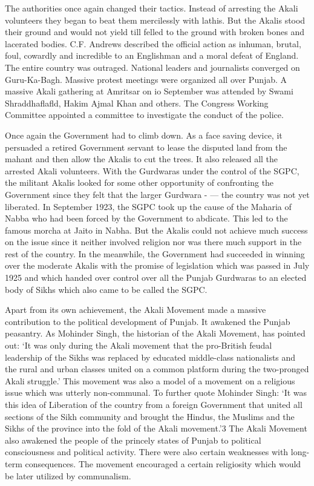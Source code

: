 The authorities once again changed their tactics. Instead of arresting the Akali volunteers they began to beat them mercilessly with lathis. But the Akalis stood their ground and would not yield till felled to the ground with broken bones and lacerated bodies. C.F. Andrews described the official action as inhuman, brutal, foul, cowardly and incredible to an Englishman and a moral defeat of England. The entire country was outraged. National leaders and journalists converged on Guru-Ka-Bagh. Massive protest meetings were organized all over Punjab. A massive Akali gathering at Amritsar on io September was attended by Swami Shraddhaflafld, Hakim Ajmal Khan and others. The Congress Working Committee appointed a committee to investigate the conduct of the police.

Once again the Government had to climb down. As a face saving device, it persuaded a retired Government servant to lease the disputed land from the mahant and then allow the Akalis to cut the trees. It also released all the arrested Akali volunteers. With the Gurdwaras under the control of the SGPC, the militant Akalis looked for some other opportunity of confronting the Government since they felt that the larger Gurdwara - --- the country was not yet liberated. In September 1923, the SGPC took up the cause of the Maharia of Nabba who had been forced by the Government to abdicate. This led to the famous morcha at Jaito in Nabha. But the Akalis could not achieve much success on the issue since it neither involved religion nor was there much support in the rest of the country. In the meanwhile, the Government had succeeded in winning over the moderate Akalis with the promise of legislation which was passed in July 1925 and which handed over control over all the Punjab Gurdwaras to an elected body of Sikhs which also came to be called the SGPC.

Apart from its own achievement, the Akali Movement made a massive contribution to the political development of Punjab. It awakened the Punjab peasantry. As Mohinder Singh, the historian of the Akali Movement, has pointed out: `It was only during the Akali movement that the pro-British feudal leadership of the Sikhs was replaced by educated middle-class nationalists and the rural and urban classes united on a common platform during the two-pronged Akali struggle.' This movement was also a model of a movement on a religious issue which was utterly non-communal. To further quote Mohinder Singh: `It was this idea of Liberation of the country from a foreign Government that united all sections of the Sikh community and brought the Hindus, the Muslims and the Sikhs of the province into the fold of the Akali movement.'3 The Akali Movement also awakened the people of the princely states of Punjab to political consciousness and political activity. There were also certain weaknesses with long-term consequences. The movement encouraged a certain religiosity which would be later utilized by communalism.

